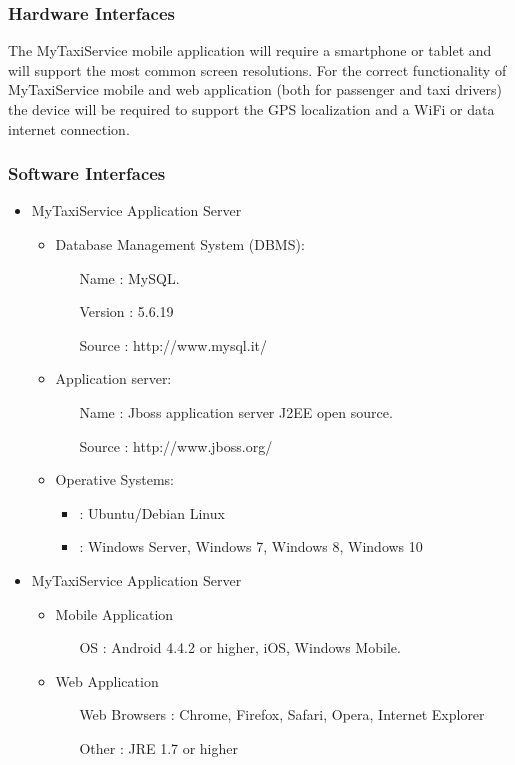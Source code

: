 \documentclass[11pt, a4paper,titlepage]{article}
\newcommand{\productname}{MyTaxiService }
\begin{document}
\subsubsection{Hardware Interfaces}
The \productname mobile application will require a smartphone or tablet and will support the most common screen resolutions. \newline
For the correct functionality of \productname mobile and web application (both for passenger and taxi drivers) the device will be required to support the GPS localization and a WiFi or data internet connection. 
\subsubsection{Software Interfaces}
\begin{itemize}
	\item \productname Application Server
		\begin{itemize}
			\item Database Management System (DBMS):
			\begin{itemize}
				\item[Name]: MySQL.
				\item[Version]:  5.6.19
				\item[Source]: http://www.mysql.it/
			\end{itemize}
			\item Application server:
			\begin{itemize}
				\item[Name]:  Jboss application server J2EE open source.
				\item[Source]: http://www.jboss.org/
			\end{itemize}
			\item Operative Systems:
			\begin{itemize}
				\item: Ubuntu/Debian Linux
				\item: Windows Server, Windows 7, Windows 8, Windows 10
			\end{itemize}
		\end{itemize}
		
	\item \productname Application Server
	\begin{itemize}
		\item Mobile Application
		\begin{itemize}
			\item[OS]: Android 4.4.2 or higher, iOS, Windows Mobile.
		\end{itemize}
	\end{itemize}
	\begin{itemize}
		\item Web Application
		\begin{itemize}
			\item[Web Browsers]: Chrome, Firefox, Safari, Opera, Internet Explorer
			\item[Other]: JRE 1.7 or higher
		\end{itemize}
	\end{itemize}	
		
\end{itemize}
\end{document}
